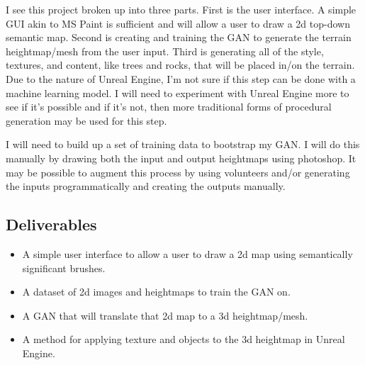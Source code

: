 \documentclass{article}
\begin{document}
	I see this project broken up into three parts. First is the user interface. A simple GUI akin to MS Paint is sufficient and will allow a user to draw a 2d top-down semantic map. Second is creating and training the GAN to generate the terrain heightmap/mesh from the user input. Third is generating all of the style, textures, and content, like trees and rocks, that will be placed in/on the terrain. Due to the nature of Unreal Engine, I'm not sure if this step can be done with a machine learning model. I will need to experiment with Unreal Engine more to see if it's possible and if it's not, then more traditional forms of procedural generation may be used for this step.
	
	I will need to build up a set of training data to bootstrap my GAN. I will do this manually by drawing both the input and output heightmaps using photoshop. It may be possible to augment this process by using volunteers and/or generating the inputs programmatically and creating the outputs manually.

	\subsection{Deliverables}

	\begin{itemize}
		\item A simple user interface to allow a user to draw a 2d map using semantically significant brushes.
		\item A dataset of 2d images and heightmaps to train the GAN on.
		\item A GAN that will translate that 2d map to a 3d heightmap/mesh.
		\item A method for applying texture and objects to the 3d heightmap in Unreal Engine.
	\end{itemize}
\end{document}
